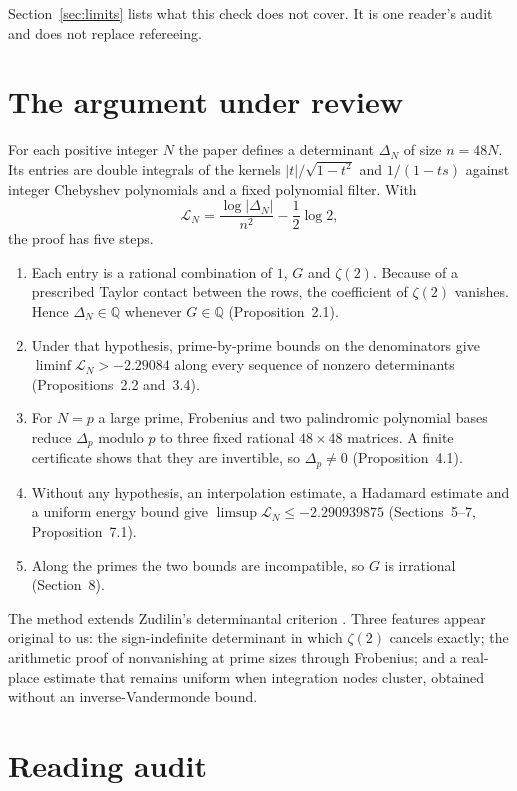 \documentclass[11pt]{article}
\begin{document}
Section~\ref{sec:limits} lists what this check does not cover. It is one reader's audit and does not replace refereeing.

\section{The argument under review}

For each positive integer $N$ the paper defines a determinant $\Delta_N$ of size $n=48N$. Its entries are double integrals of the kernels $|t|/\sqrt{1-t^2}$ and $1/(1-ts)$ against integer Chebyshev polynomials and a fixed polynomial filter. With
\[
\mathcal{L}_N=\frac{\log|\Delta_N|}{n^2}-\frac{1}{2}\log 2,
\]
the proof has five steps.

\begin{enumerate}
\item Each entry is a rational combination of $1$, $G$ and $\zeta(2)$. Because of a prescribed Taylor contact between the rows, the coefficient of $\zeta(2)$ vanishes. Hence $\Delta_N\in\mathbb{Q}$ whenever $G\in\mathbb{Q}$ (Proposition~2.1).
\item Under that hypothesis, prime-by-prime bounds on the denominators give $\liminf\mathcal{L}_N>-2.29084$ along every sequence of nonzero determinants (Propositions~2.2 and~3.4).
\item For $N=p$ a large prime, Frobenius and two palindromic polynomial bases reduce $\Delta_p$ modulo $p$ to three fixed rational $48\times48$ matrices. A finite certificate shows that they are invertible, so $\Delta_p\neq0$ (Proposition~4.1).
\item Without any hypothesis, an interpolation estimate, a Hadamard estimate and a uniform energy bound give $\limsup\mathcal{L}_N\le-2.290939875$ (Sections~5--7, Proposition~7.1).
\item Along the primes the two bounds are incompatible, so $G$ is irrational (Section~8).
\end{enumerate}

The method extends Zudilin's determinantal criterion \cite{Zud17}. Three features appear original to us: the sign-indefinite determinant in which $\zeta(2)$ cancels exactly; the arithmetic proof of nonvanishing at prime sizes through Frobenius; and a real-place estimate that remains uniform when integration nodes cluster, obtained without an inverse-Vandermonde bound.

\section{Reading audit}
\end{document}
